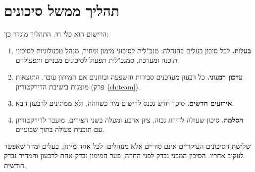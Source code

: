 \section{תהליך ממשל סיכונים}

הרישום הוא כלי חי. התהליך מוגדר כך:

\begin{enumerate}
  \item \textbf{בעלות.} לכל סיכון בעלים בהנהלה: מנכ"לית לסיכוני מימון ומחיר, מנהל טכנולוגיות לסיכוני תוכנה ומערכת, סמנכ"לית תפעול לסיכונים מבניים ותפעוליים.
  \item \textbf{עדכון רבעוני.} כל רבעון מעדכנים סבירות והשפעה ובוחנים אם המיתון עובד. התוצאות מוצגות בישיבת הדירקטוריון (פרק~\ref{ch:team}).
  \item \textbf{אירועים חדשים.} סיכון חדש נכנס לרישום מיד כשזוהה, ולא ממתינים לרבעון הבא.
  \item \textbf{הסלמה.} סיכון שעולה לדירוג גבוה, ציון ארבע ומעלה בשני הצירים, מועבר לדירקטוריון עם תוכנית פעולה בתוך שבועיים.
\end{enumerate}

\begin{insightbox}
שלושת הסיכונים העיקריים אינם סודיים אלא מנוהלים: לכל אחד מיתון, בעלים ומדד שאפשר לעקוב אחריו. הסיכון המבני נבדק לפני החוזה, פער המימון נבדק אחת לרבעון והמחיר נבדק חודשית.
\end{insightbox}
